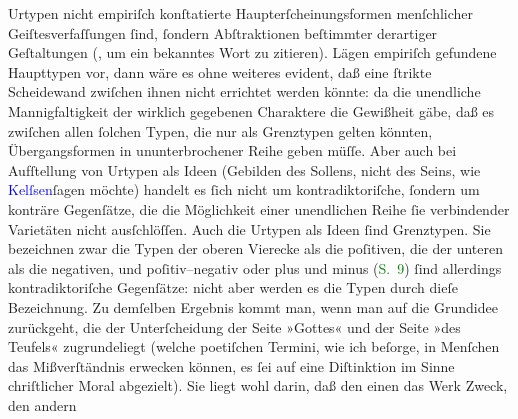                Urtypen nicht empiriſch konſtatierte Haupterſcheinungsformen menſchlicher
               Geiſtesverfaſſungen ſind, ſondern Abſtraktionen beſtimmter derartiger Geſtaltungen
                  (\label{K_L02483_2v}\label{K_L02483_2h}, um ein
               bekanntes Wort zu zitieren). Lägen empiriſch gefundene Haupttypen vor, dann wäre es
               ohne weiteres evident, daß eine ſtrikte Scheidewand zwiſchen ihnen nicht errichtet
               werden könnte: da die unendliche Mannigfaltigkeit der wirklich gegebenen Charaktere
               die Gewißheit gäbe, daß es zwiſchen allen ſolchen Typen, die nur als Grenztypen
               gelten {\pb}könnten, Übergangsformen in
               ununterbrochener Reihe geben müſſe. Aber auch bei Aufſtellung von Urtypen als Ideen
               (Gebilden des Sollens, nicht des Seins, wie \textcolor{blue}{Kelſsen}{}\ledrightnote{\textcolor{blue}{Hans Kelsen}}{ }ſagen möchte) handelt es ſich nicht um
               kontradiktoriſche, ſondern um konträre Gegenſätze, die die Möglichkeit einer
               unendlichen Reihe ſie verbindender Varietäten nicht ausſchlöſſen. Auch die Urtypen
               als Ideen ſind Grenztypen.\pend
           \pstart
           Sie bezeichnen zwar die Typen der oberen Vierecke als die poſitiven, die der unteren
               als die negativen, und poſitiv–negativ oder plus und
               minus (\textcolor{green}{S. 9}{}) ſind allerdings
               kontradiktoriſche Gegenſätze: nicht aber werden es die Typen durch dieſe
               Bezeichnung.\pend
           \pstart
           Zu demſelben Ergebnis kommt {\pb}man, wenn man
               auf die Grundidee zurückgeht, die der Unterſcheidung der Seite »Gottes« und der Seite
               »des Teufels« zugrundeliegt (welche poetiſchen Termini, wie ich beſorge, in Menſchen
               das Mißverſtändnis erwecken können, es ſei auf eine Diſtinktion im Sinne chriſtlicher
               Moral abgezielt). Sie liegt wohl darin, daß den einen das Werk Zweck, den andern
